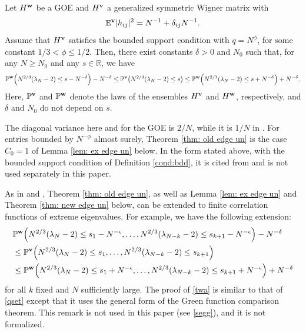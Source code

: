 
\begin{thm} \label{thm: old edge un}
Let $H^{\mathbf{w}}$ be a GOE and $H^{\mathbf{v}}$ a generalized symmetric Wigner matrix with
$$
\mathbb{E}^{\mathbf{v}} |h_{ij}|^2 = N^{-1} + \delta_{ij} N^{-1}.
$$
Assume that $H^{\mathbf{v}}$ satisfies the bounded support condition with $q=N^{\phi}$, for some constant $1/3 < \phi \leq 1/2$. Then, there exist constants $\delta > 0$ and $N_0$ such that, for any $N \geq N_0$ and any $s \in \mathbb{R}$, we have
\begin{equation} \label{qset}
\mathbb{P}^{\mathbf{w}} \Big( N^{2/3} (\lambda_N -2) \leq s - N^{-\delta} \Big) - N^{-\delta} \leq \mathbb{P}^{\mathbf{v}} \big( N^{2/3} (\lambda_N -2) \leq s \big) \leq \mathbb{P}^{\mathbf{w}} \Big( N^{2/3} (\lambda_N -2) \leq s + N^{-\delta} \Big) + N^{-\delta}.
\end{equation}
Here, $\mathbb{P}^{\mathbf{v}}$ and $\mathbb{P}^{\mathbf{w}}$ denote the laws of the ensembles $H^{\mathbf{v}}$ and $H^{\mathbf{w}}$, respectively, and $\delta$ and $N_0$ do not depend on $s$.
\end{thm}

The diagonal variance here and for the GOE is $2/N$, while it is $1/N$ in \cite[Definition 2.1]{EKYY2}. For entries bounded by $N^{-\phi}$ almost surely, Theorem \ref{thm: old edge un} is the case $C_0=1$ of Lemma \ref{lem: ex edge un} below. In the form stated above, with the bounded support condition of Definition \ref{cond:bdd}, it is cited from \cite{EKYY2} and is not used separately in this paper.

\begin{rem} \label{genedge} As in \cite{EYY} and \cite{EKYY2}, Theorem \ref{thm: old edge un}, as well as Lemma \ref{lem: ex edge un} and Theorem \ref{thm: new edge un} below, can be extended to finite correlation functions of extreme eigenvalues. For example, we have the following extension:
 \begin{align}\label{twa}
&  \mathbb{P}^{\bf w} \Big ( N^{2/3}  ( \lambda_N -2) \le s_1- N^{-\epsilon}, \ldots, N^{2/3} ( \lambda_{N-k} -2)
\le s_{k+1}- N^{-\epsilon} \Big )- N^{-\delta}   \nonumber \\
&
 \le   \mathbb{P}^{\bf v} \Big ( N^{2/3} (  \lambda_N -2) \le s_1,  \ldots, N^{2/3} ( \lambda_{N-k} -2)
\le s_{k+1}  \Big )  \\
 &  \le
 \mathbb{P}^{\bf w} \Big ( N^{2/3} ( \lambda_N -2) \le s_1+ N^{-\epsilon}, \ldots, N^{2/3} ( \lambda_{N-k} -2)
 \le s_{k+1}+ N^{-\epsilon}   \Big )+ N^{-\delta}  \nonumber
\end{align}
for all $k$ fixed and $N$ sufficiently large. The proof of \eqref{twa} is similar to that of \eqref{qset} except that it uses the general form of the Green function comparison theorem. This remark is not used in this paper (see \eqref{segg}), and it is not formalized.
\end{rem}

